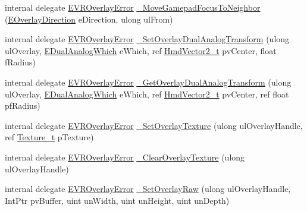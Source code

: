 \begin{DoxyCompactItemize}
internal delegate \mbox{\hyperlink{namespace_valve_1_1_v_r_aaee5c5144f42b7969d45b854f51b0c18}{E\+V\+R\+Overlay\+Error}} \mbox{\hyperlink{struct_valve_1_1_v_r_1_1_i_v_r_overlay_ae3ae1992c75afb63050b87c2e2c8bc48}{\+\_\+\+Move\+Gamepad\+Focus\+To\+Neighbor}} (\mbox{\hyperlink{namespace_valve_1_1_v_r_ad0398c1325c370eb3a4796d89610b868}{E\+Overlay\+Direction}} e\+Direction, ulong ul\+From)
\item 
internal delegate \mbox{\hyperlink{namespace_valve_1_1_v_r_aaee5c5144f42b7969d45b854f51b0c18}{E\+V\+R\+Overlay\+Error}} \mbox{\hyperlink{struct_valve_1_1_v_r_1_1_i_v_r_overlay_ae1a52476bb06ce07f2f80b32bac7b577}{\+\_\+\+Set\+Overlay\+Dual\+Analog\+Transform}} (ulong ul\+Overlay, \mbox{\hyperlink{namespace_valve_1_1_v_r_a3a5fe210bea8b993a1ad42f680119e90}{E\+Dual\+Analog\+Which}} e\+Which, ref \mbox{\hyperlink{struct_valve_1_1_v_r_1_1_hmd_vector2__t}{Hmd\+Vector2\+\_\+t}} pv\+Center, float f\+Radius)
\item 
internal delegate \mbox{\hyperlink{namespace_valve_1_1_v_r_aaee5c5144f42b7969d45b854f51b0c18}{E\+V\+R\+Overlay\+Error}} \mbox{\hyperlink{struct_valve_1_1_v_r_1_1_i_v_r_overlay_a9c8eb4e102476da54755cc70340f4c48}{\+\_\+\+Get\+Overlay\+Dual\+Analog\+Transform}} (ulong ul\+Overlay, \mbox{\hyperlink{namespace_valve_1_1_v_r_a3a5fe210bea8b993a1ad42f680119e90}{E\+Dual\+Analog\+Which}} e\+Which, ref \mbox{\hyperlink{struct_valve_1_1_v_r_1_1_hmd_vector2__t}{Hmd\+Vector2\+\_\+t}} pv\+Center, ref float pf\+Radius)
\item 
internal delegate \mbox{\hyperlink{namespace_valve_1_1_v_r_aaee5c5144f42b7969d45b854f51b0c18}{E\+V\+R\+Overlay\+Error}} \mbox{\hyperlink{struct_valve_1_1_v_r_1_1_i_v_r_overlay_a213cd2c6bbe053b4e8359ca63a2d4089}{\+\_\+\+Set\+Overlay\+Texture}} (ulong ul\+Overlay\+Handle, ref \mbox{\hyperlink{struct_valve_1_1_v_r_1_1_texture__t}{Texture\+\_\+t}} p\+Texture)
\item 
internal delegate \mbox{\hyperlink{namespace_valve_1_1_v_r_aaee5c5144f42b7969d45b854f51b0c18}{E\+V\+R\+Overlay\+Error}} \mbox{\hyperlink{struct_valve_1_1_v_r_1_1_i_v_r_overlay_a61c25dec5b16f1e2d942f792c7adc53b}{\+\_\+\+Clear\+Overlay\+Texture}} (ulong ul\+Overlay\+Handle)
\item 
internal delegate \mbox{\hyperlink{namespace_valve_1_1_v_r_aaee5c5144f42b7969d45b854f51b0c18}{E\+V\+R\+Overlay\+Error}} \mbox{\hyperlink{struct_valve_1_1_v_r_1_1_i_v_r_overlay_af2328af182be33f52a04f9a47242b811}{\+\_\+\+Set\+Overlay\+Raw}} (ulong ul\+Overlay\+Handle, Int\+Ptr pv\+Buffer, uint un\+Width, uint un\+Height, uint un\+Depth)

\end{DoxyCompactItemize}
